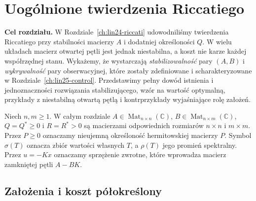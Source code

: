 \chapter{Uogólnione twierdzenia Riccatiego}
\label{ch:lin26-general-riccati}

\noindent\textbf{Cel rozdziału.}
W Rozdziale~\ref{ch:lin24-riccati}
udowodniliśmy twierdzenia Riccatiego
przy stabilności macierzy \(A\)
i dodatniej określoności \(Q\).
W wielu układach macierz otwartej
pętli jest jednak niestabilna,
a koszt nie karze każdej współrzędnej
stanu. Wykażemy, że wystarczają
\emph{stabilizowalność} pary \((A,B)\)
i \emph{wykrywalność} pary
obserwacyjnej, które zostały
zdefiniowane i scharakteryzowane
w Rozdziale~\ref{ch:lin25-control}.
Przedstawimy pełny dowód
istnienia i jednoznaczności
rozwiązania stabilizującego,
wzór na wartość optymalną,
przykłady z niestabilną otwartą
pętlą i kontrprzykłady
wyjaśniające rolę założeń.

Niech \(n,m\ge1\).
W całym rozdziale
\(A\in\operatorname{Mat}_{n\times n}(\mathbb C)\),
\(B\in\operatorname{Mat}_{n\times m}(\mathbb C)\),
\(Q=Q^*\ge0\) i
\(R=R^*>0\) są macierzami
odpowiednich rozmiarów \(n\times n\)
i \(m\times m\).
Przez \(P\ge0\)
oznaczamy nieujemną określoność
hermitowskiej macierzy \(P\).
Symbol \(\sigma(T)\) oznacza
zbiór wartości własnych \(T\),
a \(\rho(T)\) jego promień spektralny.
Przez \(u=-Kx\)
oznaczamy sprzężenie zwrotne,
które wprowadza macierz
zamkniętej pętli \(A-BK\).

\section{Założenia i koszt półokreślony}
\label{sec:lin26-hypotheses}

